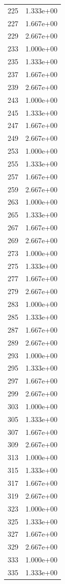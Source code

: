 \documentclass[12pt]{article}
\begin{document}
\begin{longtable}{@{}cc@{}}
225 & 1.333e+00 \\
227 & 1.667e+00 \\
229 & 2.667e+00 \\
233 & 1.000e+00 \\
235 & 1.333e+00 \\
237 & 1.667e+00 \\
239 & 2.667e+00 \\
243 & 1.000e+00 \\
245 & 1.333e+00 \\
247 & 1.667e+00 \\
249 & 2.667e+00 \\
253 & 1.000e+00 \\
255 & 1.333e+00 \\
257 & 1.667e+00 \\
259 & 2.667e+00 \\
263 & 1.000e+00 \\
265 & 1.333e+00 \\
267 & 1.667e+00 \\
269 & 2.667e+00 \\
273 & 1.000e+00 \\
275 & 1.333e+00 \\
277 & 1.667e+00 \\
279 & 2.667e+00 \\
283 & 1.000e+00 \\
285 & 1.333e+00 \\
287 & 1.667e+00 \\
289 & 2.667e+00 \\
293 & 1.000e+00 \\
295 & 1.333e+00 \\
297 & 1.667e+00 \\
299 & 2.667e+00 \\
303 & 1.000e+00 \\
305 & 1.333e+00 \\
307 & 1.667e+00 \\
309 & 2.667e+00 \\
313 & 1.000e+00 \\
315 & 1.333e+00 \\
317 & 1.667e+00 \\
319 & 2.667e+00 \\
323 & 1.000e+00 \\
325 & 1.333e+00 \\
327 & 1.667e+00 \\
329 & 2.667e+00 \\
333 & 1.000e+00 \\
335 & 1.333e+00 \\

\end{longtable}
\end{document}
